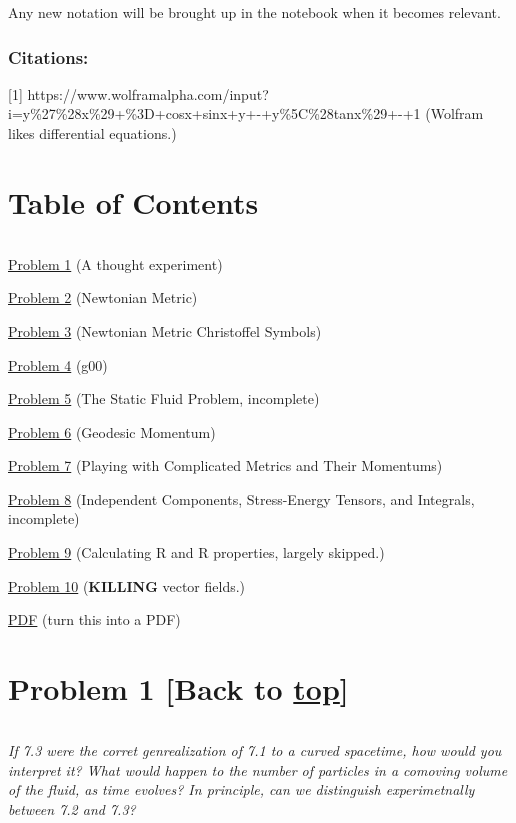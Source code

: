 \documentclass[landscape,letterpaper,10pt,english]{article}
\begin{document}
Any new notation will be brought up in the notebook when it becomes
relevant.

\hypertarget{citations}{%
\subsubsection{Citations:}\label{citations}}

{[}1{]}
https://www.wolframalpha.com/input?i=y\%27\%28x\%29+\%3D+cosx+sinx+y+-+y\%5C\%28tanx\%29+-+1
(Wolfram likes differential equations.)

    \hypertarget{table-of-contents}{%
\section{Table of Contents}\label{table-of-contents}}

\[\label{toc}\]

\hyperref[p1]{Problem 1} (A thought experiment)

\hyperref[p2]{Problem 2} (Newtonian Metric)

\hyperref[p3]{Problem 3} (Newtonian Metric Christoffel Symbols)

\hyperref[p4]{Problem 4} (g00)

\hyperref[p5]{Problem 5} (The Static Fluid Problem, incomplete)

\hyperref[p6]{Problem 6} (Geodesic Momentum)

\hyperref[p7]{Problem 7} (Playing with Complicated Metrics and Their
Momentums)

\hyperref[p8]{Problem 8} (Independent Components, Stress-Energy Tensors,
and Integrals, incomplete)

\hyperref[p9]{Problem 9} (Calculating R and R properties, largely
skipped.)

\hyperref[p10]{Problem 10} (\textbf{KILLING} vector fields.)

\hyperref[latex_pdf_output]{PDF} (turn this into a PDF)

    \hypertarget{problem-1-back-to-top}{%
\section{\texorpdfstring{Problem 1 {[}Back to
\hyperref[toc]{top}{]}}{Problem 1 {[}Back to {]}}}\label{problem-1-back-to-top}}

\[\label{P1}\]

\emph{If 7.3 were the corret genrealization of 7.1 to a curved
spacetime, how would you interpret it? What would happen to the number
of particles in a comoving volume of the fluid, as time evolves? In
principle, can we distinguish experimetnally between 7.2 and 7.3?}
\end{document}
